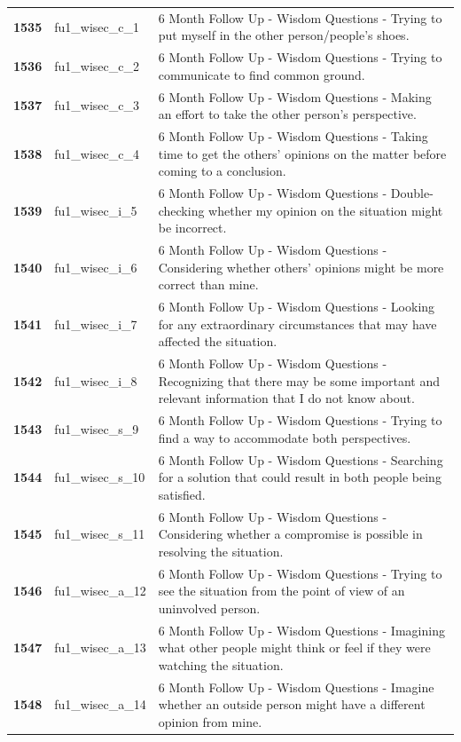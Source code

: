 \documentclass[
  letterpaper,
  DIV=11,
  numbers=noendperiod]{scrartcl}
\begin{document}
\begin{longtable}[t]{>{}cll}
\textbf{1535} & fu1\_wisec\_c\_1 & 6 Month Follow Up - Wisdom Questions - Trying to put myself in the other person/people’s shoes.\\
\addlinespace
\textbf{1536} & fu1\_wisec\_c\_2 & 6 Month Follow Up - Wisdom Questions - Trying to communicate to find common ground.\\
\textbf{1537} & fu1\_wisec\_c\_3 & 6 Month Follow Up - Wisdom Questions - Making an effort to take the other person’s perspective.\\
\textbf{1538} & fu1\_wisec\_c\_4 & 6 Month Follow Up - Wisdom Questions - Taking time to get the others’ opinions on the matter before coming to a conclusion.\\
\textbf{1539} & fu1\_wisec\_i\_5 & 6 Month Follow Up - Wisdom Questions - Double-checking whether my opinion on the situation might be incorrect.\\
\textbf{1540} & fu1\_wisec\_i\_6 & 6 Month Follow Up - Wisdom Questions - Considering whether others’ opinions might be more correct than mine.\\
\addlinespace
\textbf{1541} & fu1\_wisec\_i\_7 & 6 Month Follow Up - Wisdom Questions - Looking for any extraordinary circumstances that may have affected the situation.\\
\textbf{1542} & fu1\_wisec\_i\_8 & 6 Month Follow Up - Wisdom Questions - Recognizing that there may be some important and relevant information that I do not know about.\\
\textbf{1543} & fu1\_wisec\_s\_9 & 6 Month Follow Up - Wisdom Questions - Trying to find a way to accommodate both perspectives.\\
\textbf{1544} & fu1\_wisec\_s\_10 & 6 Month Follow Up - Wisdom Questions - Searching for a solution that could result in both people being satisfied.\\
\textbf{1545} & fu1\_wisec\_s\_11 & 6 Month Follow Up - Wisdom Questions - Considering whether a compromise is possible in resolving the situation.\\
\addlinespace
\textbf{1546} & fu1\_wisec\_a\_12 & 6 Month Follow Up - Wisdom Questions - Trying to see the situation from the point of view of an uninvolved person.\\
\textbf{1547} & fu1\_wisec\_a\_13 & 6 Month Follow Up - Wisdom Questions - Imagining what other people might think or feel if they were watching the situation.\\
\textbf{1548} & fu1\_wisec\_a\_14 & 6 Month Follow Up - Wisdom Questions - Imagine whether an outside person might have a different opinion from mine.\\

\end{longtable}
\end{document}
